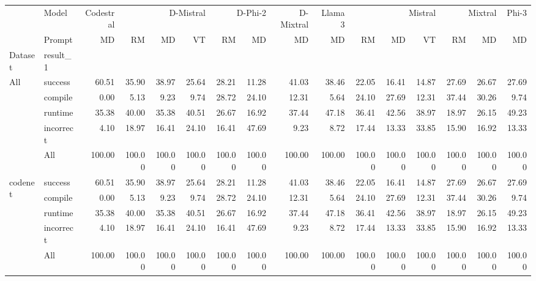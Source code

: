 \begin{tabular}{llrrrrrrrrrrrrrr}
\toprule
 & Model & Codestral & \multicolumn{3}{r}{D-Mistral} & \multicolumn{2}{r}{D-Phi-2} & D-Mixtral & Llama 3 & \multicolumn{3}{r}{Mistral} & \multicolumn{2}{r}{Mixtral} & Phi-3 \\
 & Prompt & MD & RM & MD & VT & RM & MD & MD & MD & RM & MD & VT & RM & MD & MD \\
Dataset & result_1 &  &  &  &  &  &  &  &  &  &  &  &  &  &  \\
\midrule
\multirow[t]{5}{*}{All} & success & 60.51 & 35.90 & 38.97 & 25.64 & 28.21 & 11.28 & 41.03 & 38.46 & 22.05 & 16.41 & 14.87 & 27.69 & 26.67 & 27.69 \\
 & compile & 0.00 & 5.13 & 9.23 & 9.74 & 28.72 & 24.10 & 12.31 & 5.64 & 24.10 & 27.69 & 12.31 & 37.44 & 30.26 & 9.74 \\
 & runtime & 35.38 & 40.00 & 35.38 & 40.51 & 26.67 & 16.92 & 37.44 & 47.18 & 36.41 & 42.56 & 38.97 & 18.97 & 26.15 & 49.23 \\
 & incorrect & 4.10 & 18.97 & 16.41 & 24.10 & 16.41 & 47.69 & 9.23 & 8.72 & 17.44 & 13.33 & 33.85 & 15.90 & 16.92 & 13.33 \\
 & All & 100.00 & 100.00 & 100.00 & 100.00 & 100.00 & 100.00 & 100.00 & 100.00 & 100.00 & 100.00 & 100.00 & 100.00 & 100.00 & 100.00 \\
\cline{1-16}
\multirow[t]{5}{*}{codenet} & success & 60.51 & 35.90 & 38.97 & 25.64 & 28.21 & 11.28 & 41.03 & 38.46 & 22.05 & 16.41 & 14.87 & 27.69 & 26.67 & 27.69 \\
 & compile & 0.00 & 5.13 & 9.23 & 9.74 & 28.72 & 24.10 & 12.31 & 5.64 & 24.10 & 27.69 & 12.31 & 37.44 & 30.26 & 9.74 \\
 & runtime & 35.38 & 40.00 & 35.38 & 40.51 & 26.67 & 16.92 & 37.44 & 47.18 & 36.41 & 42.56 & 38.97 & 18.97 & 26.15 & 49.23 \\
 & incorrect & 4.10 & 18.97 & 16.41 & 24.10 & 16.41 & 47.69 & 9.23 & 8.72 & 17.44 & 13.33 & 33.85 & 15.90 & 16.92 & 13.33 \\
 & All & 100.00 & 100.00 & 100.00 & 100.00 & 100.00 & 100.00 & 100.00 & 100.00 & 100.00 & 100.00 & 100.00 & 100.00 & 100.00 & 100.00 \\
\cline{1-16}
\bottomrule
\end{tabular}
